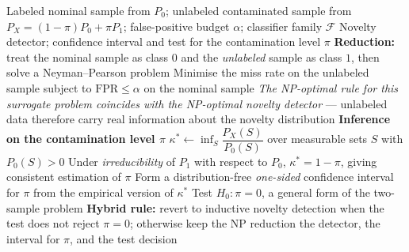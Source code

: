 \documentclass{article}
\begin{document}
\begin{algorithm}[!h]
\renewcommand{\algorithmicrequire}{\textbf{Input:}}
\renewcommand{\algorithmicensure}{\textbf{Output:}}
	\caption{SSND (semi-supervised novelty detection via reduction to NP classification)}
	\begin{algorithmic}[1]
	    \REQUIRE
	    Labeled nominal sample from $P_{0}$; unlabeled contaminated sample from
	    $P_{X}=(1-\pi)P_{0}+\pi P_{1}$; false-positive budget $\alpha$;
	    classifier family $\mathcal{F}$
	    \ENSURE
	    Novelty detector; confidence interval and test for the contamination level $\pi$
	    \STATE \textbf{Reduction:} treat the nominal sample as class $0$ and the \emph{unlabeled}
	    sample as class $1$, then solve a Neyman--Pearson problem %
	    \STATE \quad Minimise the miss rate on the unlabeled sample subject to
	    $\mathrm{FPR}\leq\alpha$ on the nominal sample
	    \STATE \quad \emph{The NP-optimal rule for this surrogate problem coincides with the
	    NP-optimal novelty detector} --- unlabeled data therefore carry real information about
	    the novelty distribution %
	    \STATE \textbf{Inference on the contamination level $\pi$}
	    \STATE $\kappa^{\ast}\leftarrow \inf_{S}\dfrac{P_{X}(S)}{P_{0}(S)}$ over measurable sets $S$
	    with $P_{0}(S)>0$ %
	    \STATE \quad Under \emph{irreducibility} of $P_{1}$ with respect to $P_{0}$,
	    $\kappa^{\ast}=1-\pi$, giving consistent estimation of $\pi$ %
	    \STATE Form a distribution-free \emph{one-sided} confidence interval for $\pi$ from the
	    empirical version of $\kappa^{\ast}$
	    \STATE Test $H_{0}:\pi=0$, a general form of the two-sample problem %
	    \STATE \textbf{Hybrid rule:} revert to inductive novelty detection when the test does not
	    reject $\pi=0$; otherwise keep the NP reduction %
		\RETURN the detector, the interval for $\pi$, and the test decision
	\end{algorithmic}
\end{algorithm}
\end{document}
